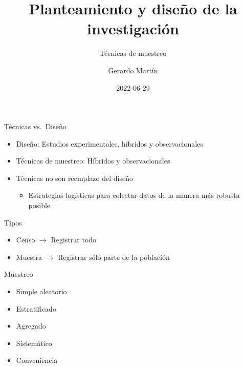 \documentclass[
  11pt,
  ignorenonframetext,
]{beamer}
\title{Planteamiento y diseño de la investigación}
\subtitle{Técnicas de muestreo}
\author{Gerardo Martín}
\date{2022-06-29}
\providecommand{\tightlist}{%
  \setlength{\itemsep}{0pt}\setlength{\parskip}{0pt}}
\begin{document}
\frame{\titlepage}

\begin{frame}{Técnicas vs.~Diseño}
\protect\hypertarget{tuxe9cnicas-vs.-diseuxf1o}{}
\begin{itemize}
\item
  Diseño: Estudios experimentales, híbridos y observacionales
\item
  Técnicas de muestreo: Híbridos y observacionales
\item
  Técnicas no son reemplazo del diseño

  \begin{itemize}
  \tightlist
  \item
    Estrategias logísticas para colectar datos de la manera más robusta
    posible
  \end{itemize}
\end{itemize}
\end{frame}

\begin{frame}{Tipos}
\protect\hypertarget{tipos}{}
\begin{itemize}
\item
  Censo \(\rightarrow\) Registrar todo
\item
  Muestra \(\rightarrow\) Registrar sólo parte de la población
\end{itemize}
\end{frame}

\begin{frame}{Muestreo}
\protect\hypertarget{muestreo}{}
\begin{itemize}
\item
  Simple aleatorio
\item
  Estratificado
\item
  Agregado
\item
  Sistemático
\item
  Conveniencia
\end{itemize}
\end{frame}
\end{document}
